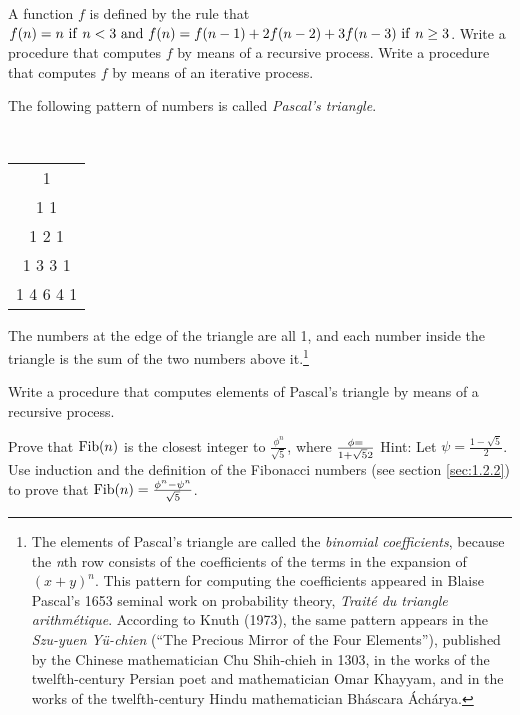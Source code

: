 \begin{Exercise}
\label{exc:1.11}
A function $f$ is defined by the rule that $f(n) = n {\rm ~if~} n < 3
{\rm ~and~} f(n) = f(n-1) + 2f(n-2) + 3f(n-3) {\rm ~if~} n \geq 3$.
Write a procedure that computes $f$ by means of a recursive process.
Write a procedure that computes $f$ by means of an iterative process.
\end{Exercise}

\begin{Exercise}
\label{exc:1.12}
The following pattern of numbers is called
\textit{Pascal's triangle}.

\begin{center}
\tt
\begin{tabular}{c}
  1 \\
  1 1 \\
  1 2 1 \\
1 3 3 1 \\
1 4 6 4 1
\end{tabular} 
\end{center}

The numbers at the edge of the triangle are all 1, and each number
inside the triangle is the sum of the two numbers above it.\footnote{
  The elements of Pascal's triangle are called the \textit{binomial
    coefficients}, because the \textit{n}th row consists of the
  coefficients of the terms in the expansion of $(x+y)^n$.  This
  pattern for computing the coefficients appeared in Blaise Pascal's
  1653 seminal work on probability theory, \textit{Trait\'e du
    triangle arithm\'etique}.  According to Knuth (1973), the same
  pattern appears in the \textit{Szu-yuen Y\"u-chien} (``The Precious
  Mirror of the Four Elements''), published by the Chinese
  mathematician Chu Shih-chieh in 1303, in the works of the
  twelfth-century Persian poet and mathematician Omar Khayyam, and in
  the works of the twelfth-century Hindu mathematician Bh\'ascara
  \'Ach\'arya.}

Write a procedure that computes elements of Pascal's triangle by means
of a recursive process.
\end{Exercise}

\begin{Exercise}
\label{exc:1.13}
Prove that ${\rm Fib}(n)$ is the closest integer to $\frac{\phi^n}{\sqrt 5}$,
where $\phi = \over{1 + \sqrt 5}{2}$  Hint: Let $\psi = \frac{1-\sqrt 5}{2}$.  Use
induction and the definition of the Fibonacci numbers (see
section \ref{sec:1.2.2}) to prove that ${\rm Fib}(n) = \frac{\phi^n - \psi^n}{\sqrt 5}$.
\end{Exercise}

